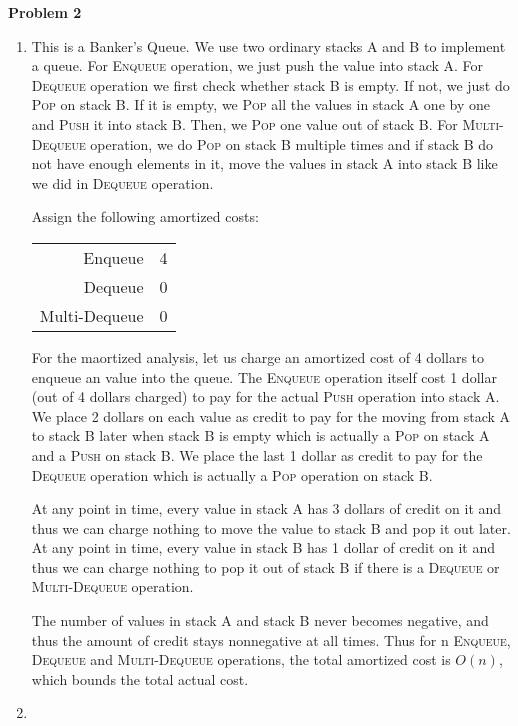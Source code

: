 \documentclass[12pt,letterpaper]{article}
\def\pp{\par\noindent}
\newcommand{\problem}[1]{ \bigskip \pp \textbf{Problem #1}\par}
\begin{document}
\problem{2}
\begin{enumerate}
	\item
		This is a Banker's Queue. We use two ordinary stacks A and B to implement a queue. For \textsc{Enqueue} operation, we just push the value into stack A. For \textsc{Dequeue} operation we first check whether stack B is empty. If not, we just do \textsc{Pop} on stack B. If it is empty, we \textsc{Pop} all the values in stack A one by one and \textsc{Push} it into stack B. Then, we \textsc{Pop} one value out of stack B. For \textsc{Multi-Dequeue} operation, we do \textsc{Pop} on stack B multiple times and if stack B do not have enough elements in it, move the values in stack A into stack B like we did in \textsc{Dequeue} operation.\par
		Assign the following amortized costs:\\
		\begin{center}
		\begin{tabular} {r c}
			Enqueue & 4 \\
			Dequeue & 0 \\
			Multi-Dequeue & 0 \\
		\end{tabular}
		\end{center}
		For the maortized analysis, let us charge an amortized cost of 4 dollars to enqueue an value into the queue. The \textsc{Enqueue} operation itself cost 1 dollar (out of 4 dollars charged) to pay for the actual \textsc{Push} operation into stack A. We place 2 dollars on each value as credit to pay for the moving from stack A to stack B later when stack B is empty which is actually a \textsc{Pop} on stack A and a \textsc{Push} on stack B. We place the last 1 dollar as credit to pay for the \textsc{Dequeue} operation which is actually a \textsc{Pop} operation on stack B.\par
		At any point in time, every value in stack A has 3 dollars of credit on it and thus we can charge nothing to move the value to stack B and pop it out later. At any point in time, every value in stack B has 1 dollar of credit on it and thus we can charge nothing to pop it out of stack B if there is a \textsc{Dequeue} or \textsc{Multi-Dequeue} operation.\par
		The number of values in stack A and stack B never becomes negative, and thus the amount of credit stays nonnegative at all times. Thus for n \textsc{Enqueue}, \textsc{Dequeue} and \textsc{Multi-Dequeue} operations, the total amortized cost is $O(n)$, which bounds the total actual cost.\par
	\item

\end{enumerate}
\end{document}
